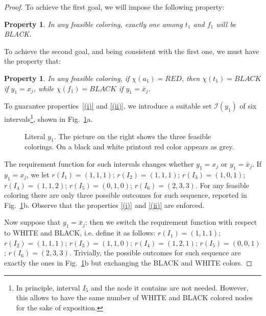 \documentclass[a4paper,11pt]{article}
\theoremstyle{theorem}
\newtheorem{property}[theorem]{Property}
\begin{document}
\begin{proof}
To achieve the first goal, we will impose the following property: 

\begin{property}\label{(i)}
In any feasible coloring, exactly one among $t_1$ and $f_1$ will be BLACK.
\end{property}

\noindent To achieve the second goal, and being consistent with the first one, we must have the property that:

\begin{property}\label{(ii)}
In any feasible coloring, if $\chi(a_1) = RED$, then $\chi(t_1) = BLACK$ if $y_1 = x_j$, while $\chi(f_1) = BLACK$ if $y_1 = \bar x_j$. 
\end{property}

\noindent To guarantee properties~\eqref{(i)} and \eqref{(ii)}, we introduce a suitable set $\mathcal I(y_1)$ of 
six intervals\footnote{In principle, interval $I_5$ and the node it contains are not needed. However, this allows to have the same number of WHITE and BLACK colored nodes for the sake of exposition.}, shown in Fig.~\ref{fig:2}a. 

\begin{figure}[htb]
\centering
{} \hspace*{0.05 \textwidth}
\caption{Literal $y_1$. The picture on the right shows the three feasible colorings. On a black and white 
printout red color appears as grey.}
\label{fig:2}
\end{figure}

\noindent The requirement function for such intervals changes whether $y_1=x_j$ or $y_1=\bar x_j$. If $y_1=x_j$, we let $r(I_1)= (1,1,1)$; $r(I_2)= (1,1,1)$; $r(I_3)= (1,0,1)$; $r(I_4)= (1,1,2)$; $r(I_5)= (0,1,0)$;  $r(I_6)= (2,3,3)$. For any feasible coloring there are only three possible outcomes for such sequence, reported in Fig.~\ref{fig:2}b.
Observe that the properties \eqref{(i)} and \eqref{(ii)} are enforced.

Now suppose that $y_1 = \bar x_j$:  then we switch the requirement function with respect to WHITE and BLACK, i.e. define it as follows: $r(I_1)= (1,1,1)$; $r(I_2)= (1,1,1)$; $r(I_3)= (1,1,0)$; $r(I_4)= (1,2,1)$; $r(I_5)= (0,0,1)$;  $r(I_6)= (2,3,3)$.
Trivially, the possible outcomes for such sequence are exactly the ones in Fig.~\ref{fig:2}b but exchanging the BLACK and WHITE colors.
 

\end{proof}
\end{document}
